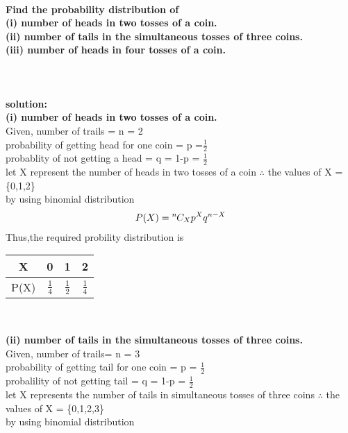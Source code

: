 \documentclass[10pt, a4paper]{article}
\newcommand*{\permcomb}[4][0mu]{{{}^{#3}\mkern#1#2_{#4}}}
\newcommand*{\comb}[1][-1mu]{\permcomb[#1]{C}}
\begin{document}
\paragraph{Find the probability distribution of\\
(i) number of heads in two tosses of a coin.\\
(ii) number of tails in the simultaneous tosses of three coins.\\
(iii) number of heads in four tosses of a coin.\\\\\\}
\textbf{solution:}\\
\textbf{(i) number of heads in two tosses of a coin.}\\
Given, number of trails = n = 2\\
probability of getting head for one coin = p =$\frac{1}{2}$\\
probablity of not getting a head = q = 1-p = $\frac{1}{2}$\\
let X represent the number of heads in two tosses of a coin
$\therefore$ the values of X = \{0,1,2\} \\
 by using binomial distribution\\
 \begin{align*}
 P(X) = \comb{n}{X}p^Xq^{n-X}
 \end{align*}
Thus,the required probility distribution is\\
\begin{center}
\begin{tabular}{ |c|c|c|c| }
\hline
X & 0 & 1 & 2 \\
\hline
P(X) & $\frac{1}{4}$ & $\frac{1}{2}$ & $\frac{1}{4}$\\
\hline
\end{tabular}\\
\vspace{2mm}
\end{center}
\textbf{(ii) number of tails in the simultaneous tosses of three coins.}\\
Given, number of trails= n = 3\\
probability of getting tail for one coin = p = $\frac{1}{2}$\\
probalility of not getting tail =  q = 1-p = $\frac{1}{2}$\\
let X represents the number of tails in simultaneous tosses of three coins
 $\therefore$ the values of X = \{0,1,2,3\}\\
 by using binomial distribution\\
\end{document}
